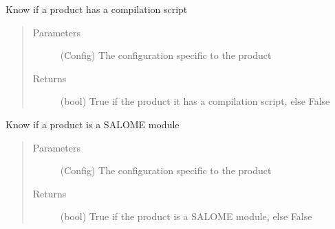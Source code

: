 \documentclass[a4paper,10pt,english]{sphinxmanual}
\begin{document}
\begin{fulllineitems}
\label{\detokenize{apidoc_src/src:src.product.product_has_script}}
Know if a product has a compilation script
\begin{quote}\begin{description}
\item[{Parameters}] \leavevmode
{} \textendash{} (Config)
The configuration specific to the product

\item[{Returns}] \leavevmode
(bool) 
True if the product it has a compilation script, else False

\end{description}\end{quote}

\end{fulllineitems}


\begin{fulllineitems}
\label{\detokenize{apidoc_src/src:src.product.product_is_SALOME}}
Know if a product is a SALOME module
\begin{quote}\begin{description}
\item[{Parameters}] \leavevmode
{} \textendash{} (Config)
The configuration specific to the product

\item[{Returns}] \leavevmode
(bool) 
True if the product is a SALOME module, else False

\end{description}\end{quote}

\end{fulllineitems}

\end{document}
